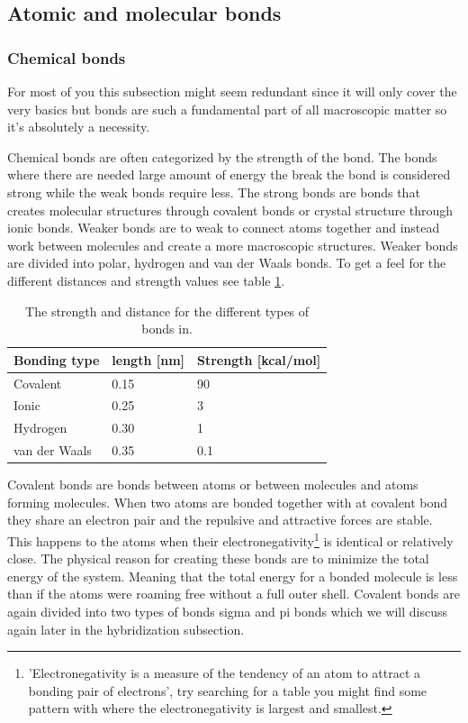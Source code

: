 \documentclass[jmp, amsmath, amssymb, reprint]{article}
\numberwithin{equation}{section}
\begin{document}
\begin{multicols}{2}
\subsection{Atomic and molecular bonds}

\subsubsection{Chemical bonds}

For most of you this subsection might seem redundant since it will only cover the very basics but bonds are such a fundamental part of all macroscopic matter so it's absolutely a necessity.

Chemical bonds are often categorized by the strength of the bond. The bonds where there are needed large amount of energy the break the bond is considered strong while the weak bonds require less. The strong bonds are bonds that creates molecular structures through covalent bonds or crystal structure through ionic bonds. Weaker bonds are to weak to connect atoms together and instead work between molecules and create a more macroscopic structures. Weaker bonds are divided into polar, hydrogen and van der Waals bonds. To get a feel for the different distances and strength values see table \ref{tabel:2}.

\begin{table}[H]
  \begin{center}
    \begin{tabular}{| l | l | l |}
   	\hline
	Bonding type & length [nm] & Strength [kcal/mol] \\ \hline
	Covalent & 0.15 & 90\\
	Ionic & 0.25 & 3\\
	Hydrogen & 0.30 & 1\\
	van der Waals & 0.35 & 0.1\\ \hline
	\end{tabular}
    \caption{The strength and distance for the different types of bonds in.}
    \label{tabel:2}
  \end{center}
\end{table}
\FloatBarrier

Covalent bonds are bonds between atoms or between molecules and atoms forming molecules. When two atoms are bonded together with at covalent bond they share an electron pair and the repulsive and attractive forces are stable. This happens to the atoms when their electronegativity\footnote{'Electronegativity is a measure of the tendency of an atom to attract a bonding pair of electrons', try searching for a table you might find some pattern with where the electronegativity is largest and smallest.} is identical or relatively close. The physical reason for creating these bonds are to minimize the total energy of the system. Meaning that the total energy for a bonded molecule is less than if the atoms were roaming free without a full outer shell. Covalent bonds are again divided into two types of bonds sigma and pi bonds which we will discuss again later in the hybridization subsection.


\end{multicols}
\end{document}
